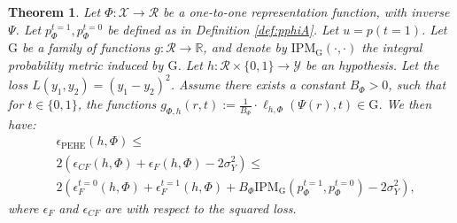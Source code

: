 \documentclass{article}
\newtheorem{thmappthm}{Theorem}
\def\cX{\mathcal X}
\def\cY{\mathcal Y}
\def\cF{\mathrm{G}}
\def\cR{\mathcal{R}}
\def \R{\mathbb{R}}
\def \epehe{\epsilon_{\text{PEHE}}}
\newcommand{\pc}{p^{t=0}}
\newcommand{\pt}{p^{t=1}}
\newcommand{\lythr}{\ell_{h,\Phi}(\Psi(r),t)}
\begin{document}
\begin{thmappthm}\label{thm:indtausqloss}
Let $\Phi : \cX \rightarrow \cR$ be a one-to-one representation function, with inverse $\Psi$. Let $\pt_\Phi, \pc_\Phi$ be defined as in Definition \ref{def:pphiA}. Let $u = p(t=1)$. Let $\cF$ be a family of functions $g:\cR \rightarrow \R$, and denote by $\text{IPM}_\cF(\cdot, \cdot)$ the integral probability metric induced by $\cF$.  Let $h : \cR \times \{0,1\} \rightarrow \cY$ be an hypothesis. Let the loss $L(y_1,y_2) = (y_1 - y_2)^2$.  Assume there exists a constant $B_\Phi>0$, such that for $t \in \{0,1\}$, the functions $g_{\Phi,h}(r,t) := \frac{1}{B_\Phi} \cdot  \lythr \in \cF$.
We then have:
\begin{align*}
&\epehe(h,\Phi) \leq  \nonumber \\
& 2\!\left(\epsilon_{CF}(h,\Phi) + \epsilon_F(h,\Phi) - 2\sigma^2_Y \right) \leq  \nonumber \\
&2\!\left(\epsilon_F^{t=0}(h,\Phi)\! +\!\epsilon_F^{t=1}(h,\Phi)\!+ \! B_\Phi  \text{IPM}_\cF \left( \pt_\Phi, \pc_\Phi \right)\! -\! 2\sigma^2_Y\right)\!,
\end{align*}
where $\epsilon_F$ and $\epsilon_{CF}$ are with respect to the squared loss.
\end{thmappthm}
\end{document}
